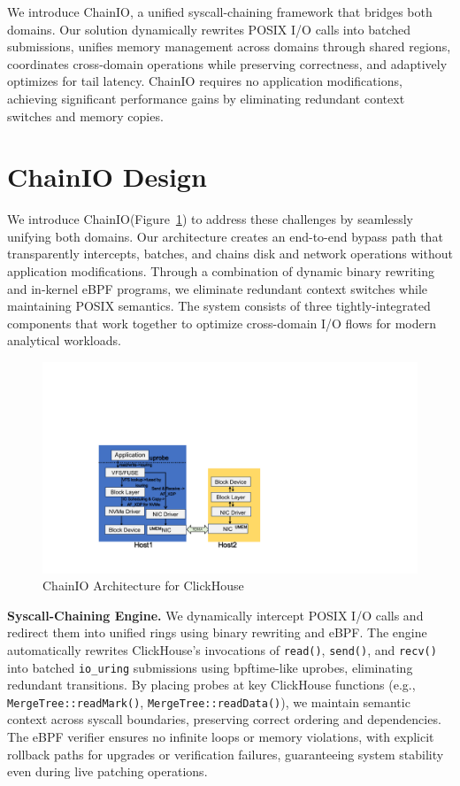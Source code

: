 \documentclass[sigconf,10pt]{acmart}
\newcommand{\sys}{ChainIO\xspace}
\begin{document}
We introduce \sys, a unified syscall-chaining framework that bridges both domains. Our solution dynamically rewrites POSIX I/O calls into batched submissions, unifies memory management across domains through shared regions, coordinates cross-domain operations while preserving correctness, and adaptively optimizes for tail latency. \sys requires no application modifications, achieving significant performance gains by eliminating redundant context switches and memory copies.

\section{\sys Design}\label{sec:design}

We introduce \sys (Figure~\ref{fig:bur}) to address these challenges by seamlessly unifying both domains. Our architecture creates an end-to-end bypass path that transparently intercepts, batches, and chains disk and network operations without application modifications. Through a combination of dynamic binary rewriting and in-kernel eBPF programs, we eliminate redundant context switches while maintaining POSIX semantics. The system consists of three tightly-integrated components that work together to optimize cross-domain I/O flows for modern analytical workloads.

\begin{figure}[h]
\centering
\includegraphics[width=\columnwidth]{img/bur.pdf}
\caption{\sys Architecture for ClickHouse}\label{fig:bur}
\end{figure}

\textbf{Syscall-Chaining Engine.} We dynamically intercept POSIX I/O calls and redirect them into unified rings using binary rewriting and eBPF. The engine automatically rewrites ClickHouse's invocations of \texttt{read()}, \texttt{send()}, and \texttt{recv()} into batched \texttt{io\_uring} submissions using bpftime-like uprobes, eliminating redundant transitions. By placing probes at key ClickHouse functions (e.g., \texttt{MergeTree::readMark()}, \texttt{MergeTree::readData()}), we maintain semantic context across syscall boundaries, preserving correct ordering and dependencies. The eBPF verifier ensures no infinite loops or memory violations, with explicit rollback paths for upgrades or verification failures, guaranteeing system stability even during live patching operations.
\end{document}
